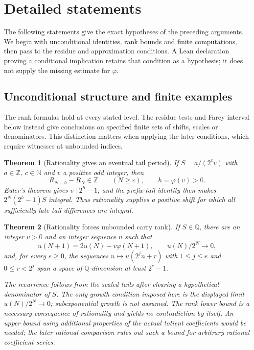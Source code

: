 \documentclass[11pt]{article}
\theoremstyle{plain}
\newtheorem{thm}{Theorem}[section]
\theoremstyle{definition}
\theoremstyle{remark}
\begin{document}
\section{Detailed statements}

The following statements give the exact hypotheses of the preceding
arguments. We begin with unconditional identities, rank bounds and
finite computations, then pass to the residue and approximation
conditions. A Lean declaration proving a conditional implication
retains that condition as a hypothesis; it does not supply the
missing estimate for $\varphi$.

\subsection{Unconditional structure and finite examples}

The rank formulas hold at every stated level. The residue tests and
Farey interval below instead give conclusions on specified finite
sets of shifts, scales or denominators. This distinction matters when
applying the later conditions, which require witnesses at unbounded
indices.

\begin{thm}[Rationality gives an eventual tail period]\label{catalogue:cert:a9}
If $S=a/(2^cv)$ with $a\in\mathbb Z$, $c\in\mathbb N$ and $v$ a
positive odd integer, then
\[
 R_{N+h}-R_N\in\mathbb Z\qquad(N\ge c),\qquad h=\varphi(v)>0.
\]
Euler's theorem gives $v\mid2^h-1$, and the prefix-tail identity then
makes $2^N(2^h-1)S$ integral. Thus rationality supplies a positive
shift for which all sufficiently late tail differences are integral.
\end{thm}

\begin{thm}[Rationality forces unbounded carry rank]\label{catalogue:cert:d5}
If $S\in\mathbb Q$, there are an integer $v>0$ and an integer sequence
$u$ such that
\[
 u(N+1)=2u(N)-v\varphi(N+1),\qquad u(N)/2^N\longrightarrow0,
\]
and, for every $e\ge0$, the sequences
$ n\mapsto u(2^jn+r)$ with $1\le j\le e$ and $0\le r<2^j$
span a space of $\mathbb Q$-dimension at least $2^e-1$.

The recurrence follows from the scaled tails after clearing a
hypothetical denominator of $S$. The only growth condition imposed
here is the displayed limit $u(N)/2^N\to0$; subexponential growth is
not assumed. The rank lower bound is a necessary consequence of
rationality and yields no contradiction by itself. An upper
bound using additional properties of the actual totient coefficients
would be needed; the later rational comparison rules out such a bound
for arbitrary rational coefficient series.
\end{thm}
\end{document}
